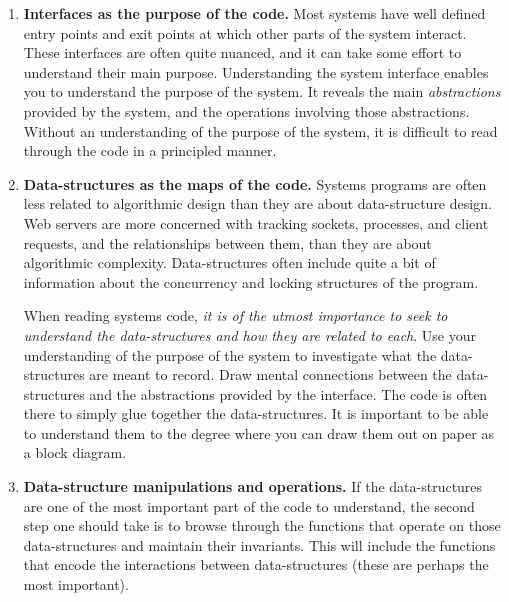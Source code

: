 \documentclass[11pt,onecolumn]{article}
\newcommand{\lsthead}[1]{{\bf #1}}
\begin{document}
\begin{enumerate}[itemsep=0pt,topsep=1pt,parsep=1pt,leftmargin=2.5em]
\item \lsthead{Interfaces as the purpose of the code.}  Most systems
  have well defined entry points and exit points at which other parts
  of the system interact.  These interfaces are often quite nuanced,
  and it can take some effort to understand their main purpose.
  Understanding the system interface enables you to understand the
  purpose of the system.  It reveals the main {\em abstractions}
  provided by the system, and the operations involving those
  abstractions.  Without an understanding of the purpose of the
  system, it is difficult to read through the code in a principled
  manner.
\item \lsthead{Data-structures as the maps of the code.}  Systems
  programs are often less related to algorithmic design than they are
  about data-structure design.  Web servers are more concerned with
  tracking sockets, processes, and client requests, and the
  relationships between them, than they are about algorithmic
  complexity.  Data-structures often include quite a bit of
  information about the concurrency and locking structures of the
  program.  

  When reading systems code, {\em it is of the utmost importance to
    seek to understand the data-structures and how they are related to
    each}.  Use your understanding of the purpose of the system to
  investigate what the data-structures are meant to record.  Draw
  mental connections between the data-structures and the abstractions
  provided by the interface.  The code is often there to simply glue
  together the data-structures.  It is important to be able to
  understand them to the degree where you can draw them out on paper
  as a block diagram.
\item \lsthead{Data-structure manipulations and operations.}  If the
  data-structures are one of the most important part of the code to
  understand, the second step one should take is to browse through the
  functions that operate on those data-structures and maintain their
  invariants.  This will include the functions that encode the
  interactions between data-structures (these are perhaps the most
  important).


\end{enumerate}
\end{document}
